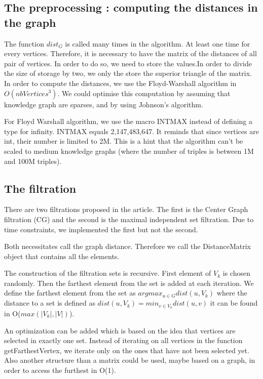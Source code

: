 \documentclass{article}
\begin{document}
\subsection{The preprocessing : computing the distances in the graph}
The function $dist_{G}$ is called many times in the algorithm. At least one time for every vertices. Therefore, it is necessary to have the matrix of the distances of all pair of vertices. In order to do so, we need to store the values.In order to divide the size of storage by two, we only the store the superior triangle of the matrix. 
In order to compute the distances, we use the Floyd-Warshall algorithm in $O(nbVertices^3)$. We could optimise this computation by assuming that knowledge graph are sparses, and by using Johnson's algorithm.  

For Floyd Warshall algorithm, we use the macro INT\underscore MAX instead of defining a type for infinity. INT\underscore MAX equals 2,147,483,647. It reminds that since vertices are int, their number is limited to 2M. This is a hint that the algorithm can't be scaled to medium knowledge graphs (where the number of triples is between 1M and 100M triples). 


\subsection{The filtration}
There are two filtrations proposed in the article. 
The first is the Center Graph filtration (CG) and the second is the maximal independent set filtration.
Due to time constraints, we implemented the first but not the second. 

Both necessitates call the graph distance. Therefore we call the DistanceMatrix object that contains all the elements.  

The construction of the filtration sets is recursive.
First element of $V_{k}$ is chosen randomly. 
Then the farthest element from the set is added at each iteration. 
We define the farthest element from the set as 
$argmax_{u \in G} dist(u, V_{k})$
where the distance to a set is defined as $dist(u, V_{k}) = min_{v \in V_{k}} dist(u, v)$
it can be found in O($ max(|V_{k}|, |V|)$). 

An optimization can be added which is based on the idea that vertices are selected in exactly one set. Instead of iterating on all vertices in the function getFarthestVertex, we iterate only on the ones that have not been selected yet. Also another structure than a matrix could be used, maybe based on a graph, in order to access the furthest in O(1). 
\end{document}
